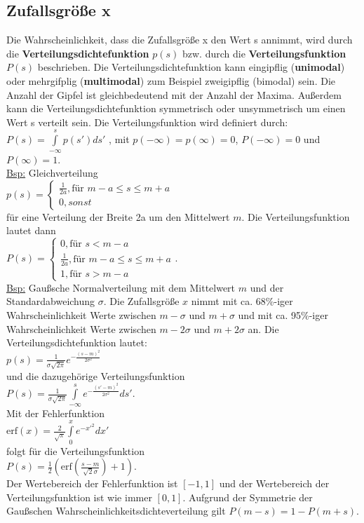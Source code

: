 \subsection{Zufallsgröße x}
Die Wahrscheinlichkeit, dass die Zufallsgröße x den Wert s annimmt, wird durch die {\bf Verteilungsdichtefunktion} $p(s)$ bzw. durch die {\bf Verteilungsfunktion} $P(s)$ beschrieben. Die Verteilungsdichtefunktion kann eingipflig ({\bf unimodal}) oder mehrgifplig ({\bf multimodal}) zum Beispiel zweigipflig (bimodal) sein. Die Anzahl der Gipfel ist gleichbedeutend mit der Anzahl der Maxima. Außerdem kann die Verteilungsdichtefunktion symmetrisch oder unsymmetrisch um einen Wert s verteilt sein. Die Verteilungsfunktion wird definiert durch:\\ $P(s)=\int\limits_{-\infty}^s p(s')ds'$ , mit $p(-\infty)=p(\infty)=0$, $P(-\infty)=0$ und $P(\infty)=1$.\\
\underline {Bsp:} Gleichverteilung\\
$p(s)=\begin{cases}
  \frac{1}{2a},\text{für    }     m-a\leq s\leq m+a\\
 0, sonst 
\end{cases}$ \\für eine Verteilung der Breite 2a um den Mittelwert $m$. Die Verteilungsfunktion lautet dann \\ 
$P(s)=\begin{cases}
0,\text{für    } s<m-a\\
\frac{1}{2a},\text{für    }     m-a\leq s\leq m+a\\
1,\text{für    } s>m-a
\end{cases}$.
\\ \underline {Bsp:} Gaußsche Normalverteilung mit dem Mittelwert $m$ und der Standardabweichung $\sigma$. Die Zufallsgröße $x$ nimmt mit ca. 68\%-iger Wahrscheinlichkeit Werte zwischen $m-\sigma$ und $m+\sigma$ und mit ca. 95\%-iger Wahrscheinlichkeit Werte zwischen $m-2\sigma$ und $m+2\sigma$ an. Die Verteilungsdichtefunktion lautet:\\
$p(s)=\frac{1}{\sigma \sqrt{2\pi}}e^{-\frac{(s-m)^2}{2\sigma^2}}$ \\
und die dazugehörige Verteilungsfunktion\\  
$P(s)=\frac{1}{\sigma \sqrt{2\pi}}\int\limits_{-\infty}^s e^{{-\frac{(s'-m)^2}{2\sigma^2}}}ds'$.\\
Mit der Fehlerfunktion\\
$\mbox{erf}(x)=\frac{2}{\sqrt{\pi}}\int\limits_0^x e^{-x'^2}dx'$\\
folgt für die Verteilungsfunktion\\
$P(s) = \frac{1}{2}(\mbox{erf}(\frac{s-m}{\sqrt{2} \sigma}) + 1).$\\
Der Wertebereich der Fehlerfunktion ist $[-1,1]$ und der Wertebereich der Verteilungsfunktion ist wie immer $[0,1]$. Aufgrund der Symmetrie der Gaußschen Wahrscheinlichkeitsdichteverteilung gilt $P(m-s) = 1- P(m+s)$.


